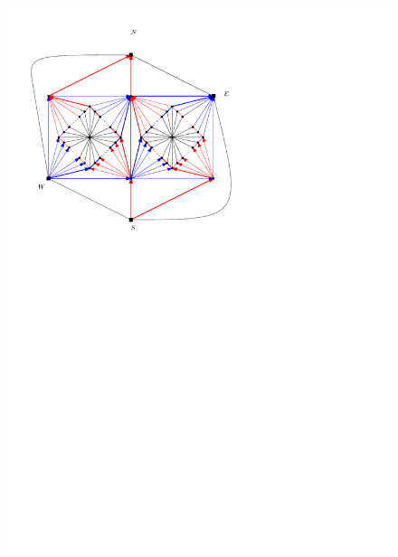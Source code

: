   \begin{figure}[h]
    \centering
    \includegraphics[scale=1]{fixExtension/img/manymany4}
    \caption{}
    \label{fig:fix:manymany4}
  \end{figure}

